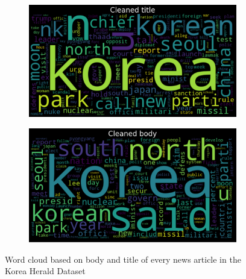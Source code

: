 \documentclass[sigconf,authorversion,nonacm]{acmart}
\begin{document}
\begin{figure}[h!]
    \begin{subfigure}{0.5\linewidth}
        \includegraphics[width=0.9\linewidth]{img/title.png}
    \end{subfigure}%
    \begin{subfigure}{0.5\linewidth}
        \includegraphics[width=0.9\linewidth]{img/body.png}
    \end{subfigure}
    \caption{Word cloud based on body and title of every news article in the Korea Herald Dataset}
\end{figure}

\nocite{*}


\end{document}
